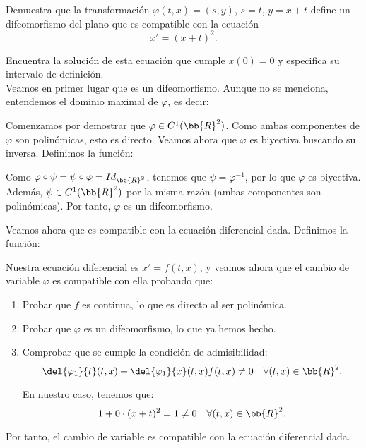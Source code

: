 \documentclass[12pt]{article}
\begin{document}
\begin{ejercicio}
    Demuestra que la transformación \(\varphi(t, x) = (s, y)\), \(s = t\), \(y = x + t\) define un difeomorfismo del plano que es compatible con la ecuación
    \[
        x' = (x + t)^2.
    \]

    Encuentra la solución de esta ecuación que cumple \(x(0) = 0\) y especifica su intervalo de definición.\\

    Veamos en primer lugar que es un difeomorfismo.
    Aunque no se menciona, entendemos el dominio maximal de $\varphi$, es decir:

    Comenzamos por demostrar que $\varphi\in C^1(\bb{R}^2)$. Como ambas componentes de $\varphi$ son polinómicas, esto es directo. Veamos ahora que $\varphi$ es biyectiva buscando su inversa.
    Definimos la función:

    Como $\varphi\circ \psi = \psi\circ \varphi = Id_{\bb{R}^2}$, tenemos que $\psi=\varphi^{-1}$, por lo que $\varphi$ es biyectiva. Además, $\psi\in C^1(\bb{R}^2)$ por la misma razón (ambas componentes son polinómicas).
    Por tanto, $\varphi$ es un difeomorfismo. 
    
    Veamos ahora que es compatible con la ecuación diferencial dada. Definimos la función:

    Nuestra ecuación diferencial es $x' = f(t,x)$, y veamos ahora que el cambio de variable $\varphi$ es compatible con ella probando que:
    \begin{enumerate}
        \item Probar que $f$ es continua, lo que es directo al ser polinómica.
        \item Probar que $\varphi$ es un difeomorfismo, lo que ya hemos hecho.
        \item Comprobar que se cumple la condición de admisibilidad:
        \begin{equation*}
            \del{\varphi_1}{t}(t,x)+ \del{\varphi_1}{x}(t,x)f(t,x) \neq 0 \quad \forall (t,x)\in \bb{R}^2.
        \end{equation*}

        En nuestro caso, tenemos que:
        \begin{equation*}
            1+0\cdot (x+t)^2 = 1 \neq 0 \quad \forall (t,x)\in \bb{R}^2.
        \end{equation*}
    \end{enumerate}
    Por tanto, el cambio de variable es compatible con la ecuación diferencial dada.\\


\end{ejercicio}
\end{document}
